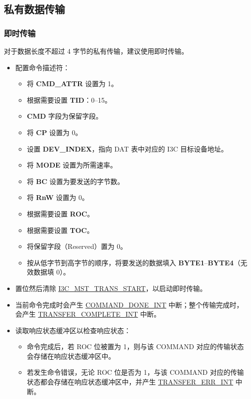 \documentclass[main\_\_CN.tex]{subfiles}
\begin{document}
\subsection{私有数据传输}

\subsubsection{即时传输}
对于数据长度不超过 4 字节的私有传输，建议使用即时传输。

\begin{itemize}
    \item 配置命令描述符：
    \begin{itemize}
        \item 将 \textbf{CMD\_ATTR} 设置为 1。
        \item 根据需要设置 \textbf{TID}：0–15。
        \item \textbf{CMD} 字段为保留字段。
        \item 将 \textbf{CP} 设置为 0。
        \item 设置 \textbf{DEV\_INDEX}，指向 DAT 表中对应的 I3C 目标设备地址。
        \item 将 \textbf{MODE} 设置为所需速率。
        \item 将 \textbf{BC} 设置为要发送的字节数。
        \item 将 \textbf{RnW} 设置为 0。
        \item 根据需要设置 \textbf{ROC}。
        \item 根据需要设置 \textbf{TOC}。
        \item 将保留字段（Reserved）置为 0。
        \item 按从低字节到高字节的顺序，将要发送的数据填入 \textbf{BYTE1}–\textbf{BYTE4}（无效数据填 0）。
    \end{itemize}
    \item 置位然后清除 \hyperref[fielddesc:I3CMSTREGTRANSSTART]{I3C\_MST\_TRANS\_START}，以启动即时传输。
    \item 当前命令完成时会产生 \hyperref[int:COMMANDDONEINT]{COMMAND\_DONE\_INT} 中断；整个传输完成时，会产生 \hyperref[int:TRANSFERCOMPLETEINT]{TRANSFER\_COMPLETE\_INT} 中断。
    \item 读取响应状态缓冲区以检查响应状态：
    \begin{itemize}
        \item 命令完成后，若 ROC 位被置为 1，则与该 COMMAND 对应的传输状态会存储在响应状态缓冲区中。
        \item 若发生命令错误，无论 ROC 位是否为 1，与该 COMMAND 对应的传输状态都会存储在响应状态缓冲区中，并产生 \hyperref[int:TRANSFERERRINT]{TRANSFER\_ERR\_INT} 中断。
    \end{itemize}
\end{itemize}
\end{document}
